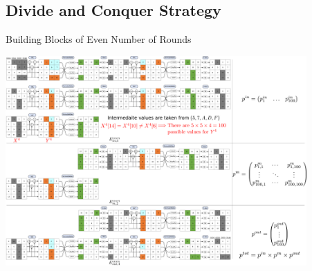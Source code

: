 \documentclass{beamer}
\begin{document}
\subsection{Divide and Conquer Strategy}
\begin{frame}{Building Blocks of Even Number of Rounds}
\begin{center}
\includegraphics[width=115mm]{./Images/building_blocks_even.pdf}
\end{center}

\end{frame}

\end{document}
